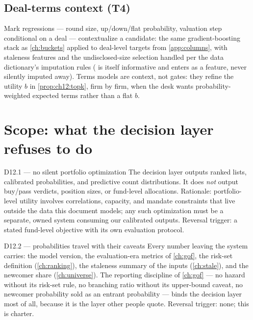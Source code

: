 \subsection{Deal-terms context (T4)}

Mark regressions --- round size, up/down/flat probability, valuation
step conditional on a deal --- contextualize a candidate: the same
gradient-boosting stack as \cref{ch:buckets} applied to deal-level
targets from \cref{app:columns}, with staleness features and the
undisclosed-size selection handled per the data dictionary's imputation
rules ( is itself informative and enters as a
feature, never silently imputed away). Terms models are context, not
gates: they refine the utility $b$ in \cref{prop:ch12:topk}, firm by
firm, when the desk wants probability-weighted expected terms rather
than a flat $b$.

\section{Scope: what the decision layer refuses to do}\label{ch12:sec:scope}

\begin{decision}{D12.1 --- no silent portfolio optimization}
The decision layer outputs ranked lists, calibrated probabilities, and
predictive count distributions. It does \emph{not} output buy/pass
verdicts, position sizes, or fund-level allocations. Rationale:
portfolio-level utility involves correlations, capacity, and mandate
constraints that live outside the data this document models; any such
optimization must be a separate, owned system consuming our calibrated
outputs. Reversal trigger: a stated fund-level objective with its own
evaluation protocol.
\end{decision}

\begin{decision}{D12.2 --- probabilities travel with their caveats}
Every number leaving the system carries: the model version, the
evaluation-era metrics of \cref{ch:gof}, the risk-set definition
(\cref{ch:ranking}), the staleness summary of the inputs
(\cref{ch:stale}), and the newcomer share (\cref{ch:universe}). The
reporting discipline of \cref{ch:gof} --- no hazard without its risk-set
rule, no branching ratio without its upper-bound caveat, no newcomer
probability sold as an entrant probability --- binds the decision layer
most of all, because it is the layer other people quote. Reversal
trigger: none; this is charter.
\end{decision}

